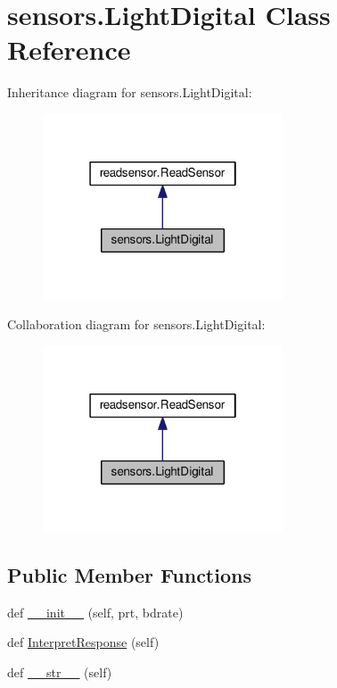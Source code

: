\hypertarget{classsensors_1_1LightDigital}{}\section{sensors.\+Light\+Digital Class Reference}
\label{classsensors_1_1LightDigital}


Inheritance diagram for sensors.\+Light\+Digital\+:\nopagebreak
\begin{figure}[H]
\begin{center}
\leavevmode
\includegraphics[width=202pt]{classsensors_1_1LightDigital__inherit__graph}
\end{center}
\end{figure}


Collaboration diagram for sensors.\+Light\+Digital\+:\nopagebreak
\begin{figure}[H]
\begin{center}
\leavevmode
\includegraphics[width=202pt]{classsensors_1_1LightDigital__coll__graph}
\end{center}
\end{figure}
\subsection*{Public Member Functions}
\begin{DoxyCompactItemize}
\item 
def \hyperlink{classsensors_1_1LightDigital_aea795c27407bb29a13affc59590f3d35}{\+\_\+\+\_\+init\+\_\+\+\_\+} (self, prt, bdrate)
\item 
def \hyperlink{classsensors_1_1LightDigital_a9c4ce46c5f389829d0c5e0bfe2a0f2b2}{Interpret\+Response} (self)
\item 
def \hyperlink{classsensors_1_1LightDigital_a41c4038570137761e4f9600e487e3f6b}{\+\_\+\+\_\+str\+\_\+\+\_\+} (self)
\end{DoxyCompactItemize}
